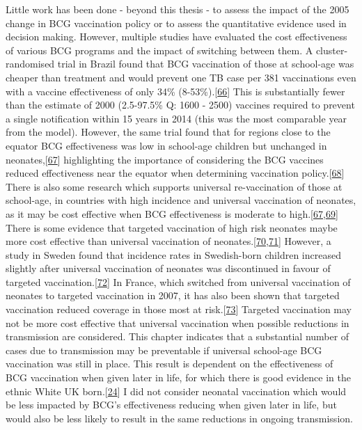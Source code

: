 \documentclass[11pt,twoside]{bristolthesis}
\begin{document}
  Little work has been done - beyond this thesis - to assess the impact of the 2005 change in BCG vaccination policy or to assess the quantitative evidence used in decision making. However, multiple studies have evaluated the cost effectiveness of various BCG programs and the impact of switching between them. A cluster-randomised trial in Brazil found that BCG vaccination of those at school-age was cheaper than treatment and would prevent one TB case per 381 vaccinations even with a vaccine effectiveness of only 34\% (8-53\%).{[}\protect\hyperlink{ref-Pereira2012}{66}{]} This is substantially fewer than the estimate of 2000 (2.5-97.5\% Q: 1600 - 2500) vaccines required to prevent a single notification within 15 years in 2014 (this was the most comparable year from the model). However, the same trial found that for regions close to the equator BCG effectiveness was low in school-age children but unchanged in neonates,{[}\protect\hyperlink{ref-Barreto2014a}{67}{]} highlighting the importance of considering the BCG vaccines reduced effectiveness near the equator when determining vaccination policy.{[}\protect\hyperlink{ref-Fine1995}{68}{]} There is also some research which supports universal re-vaccination of those at school-age, in countries with high incidence and universal vaccination of neonates, as it may be cost effective when BCG effectiveness is moderate to high.{[}\protect\hyperlink{ref-Barreto2014a}{67},\protect\hyperlink{ref-Dye2013a}{69}{]} There is some evidence that targeted vaccination of high risk neonates maybe more cost effective than universal vaccination of neonates.{[}\protect\hyperlink{ref-Usher2016}{70},\protect\hyperlink{ref-Hersh2003}{71}{]} However, a study in Sweden found that incidence rates in Swedish-born children increased slightly after universal vaccination of neonates was discontinued in favour of targeted vaccination.{[}\protect\hyperlink{ref-Romanus1992}{72}{]} In France, which switched from universal vaccination of neonates to targeted vaccination in 2007, it has also been shown that targeted vaccination reduced coverage in those most at risk.{[}\protect\hyperlink{ref-Guthmann2011}{73}{]} Targeted vaccination may not be more cost effective that universal vaccination when possible reductions in transmission are considered. This chapter indicates that a substantial number of cases due to transmission may be preventable if universal school-age BCG vaccination was still in place. This result is dependent on the effectiveness of BCG vaccination when given later in life, for which there is good evidence in the ethnic White UK born.{[}\protect\hyperlink{ref-Hart1972}{24}{]} I did not consider neonatal vaccination which would be less impacted by BCG's effectiveness reducing when given later in life, but would also be less likely to result in the same reductions in ongoing transmission.
  
\end{document}
